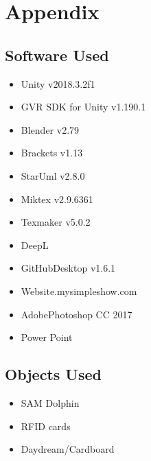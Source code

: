 \documentclass [12pt]{article}
\begin{document}
\section{Appendix}
\subsection{Software Used}
\begin{itemize}[•]
\item Unity v2018.3.2f1
\item GVR SDK for Unity v1.190.1
\item Blender v2.79
\item Brackets v1.13
\item StarUml v2.8.0
\item Miktex v2.9.6361
\item Texmaker v5.0.2
\item DeepL
\item GitHubDesktop v1.6.1
\item Website.mysimpleshow.com
\item AdobePhotoshop CC 2017
\item Power Point
\end{itemize}

\subsection{Objects Used}
\begin{itemize}[•]
\item SAM Dolphin
\item RFID cards
\item Daydream/Cardboard
\end{itemize}
\end{document}
